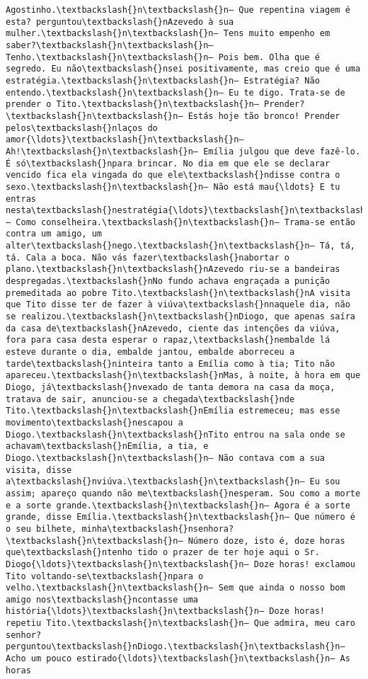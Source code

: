 \documentclass[11pt]{article}
\begin{document}
\begin{Verbatim}[commandchars=\\\{\}]
Agostinho.\textbackslash{}n\textbackslash{}n— Que repentina viagem é esta? perguntou\textbackslash{}nAzevedo à sua mulher.\textbackslash{}n\textbackslash{}n— Tens muito empenho em saber?\textbackslash{}n\textbackslash{}n— Tenho.\textbackslash{}n\textbackslash{}n— Pois bem. Olha que é segredo. Eu não\textbackslash{}nsei positivamente, mas creio que é uma estratégia.\textbackslash{}n\textbackslash{}n— Estratégia? Não entendo.\textbackslash{}n\textbackslash{}n— Eu te digo. Trata-se de prender o Tito.\textbackslash{}n\textbackslash{}n— Prender?\textbackslash{}n\textbackslash{}n— Estás hoje tão bronco! Prender pelos\textbackslash{}nlaços do amor{\ldots}\textbackslash{}n\textbackslash{}n— Ah!\textbackslash{}n\textbackslash{}n— Emília julgou que deve fazê-lo. É só\textbackslash{}npara brincar. No dia em que ele se declarar vencido fica ela vingada do que ele\textbackslash{}ndisse contra o sexo.\textbackslash{}n\textbackslash{}n— Não está mau{\ldots} E tu entras nesta\textbackslash{}nestratégia{\ldots}\textbackslash{}n\textbackslash{}n— Como conselheira.\textbackslash{}n\textbackslash{}n— Trama-se então contra um amigo, um alter\textbackslash{}nego.\textbackslash{}n\textbackslash{}n— Tá, tá, tá. Cala a boca. Não vás fazer\textbackslash{}nabortar o plano.\textbackslash{}n\textbackslash{}nAzevedo riu-se a bandeiras despregadas.\textbackslash{}nNo fundo achava engraçada a punição premeditada ao pobre Tito.\textbackslash{}n\textbackslash{}nA visita que Tito disse ter de fazer à viúva\textbackslash{}nnaquele dia, não se realizou.\textbackslash{}n\textbackslash{}nDiogo, que apenas saíra da casa de\textbackslash{}nAzevedo, ciente das intenções da viúva, fora para casa desta esperar o rapaz,\textbackslash{}nembalde lá esteve durante o dia, embalde jantou, embalde aborreceu a tarde\textbackslash{}ninteira tanto a Emília como à tia; Tito não apareceu.\textbackslash{}n\textbackslash{}nMas, à noite, à hora em que Diogo, já\textbackslash{}nvexado de tanta demora na casa da moça, tratava de sair, anunciou-se a chegada\textbackslash{}nde Tito.\textbackslash{}n\textbackslash{}nEmília estremeceu; mas esse movimento\textbackslash{}nescapou a Diogo.\textbackslash{}n\textbackslash{}nTito entrou na sala onde se achavam\textbackslash{}nEmília, a tia, e Diogo.\textbackslash{}n\textbackslash{}n— Não contava com a sua visita, disse a\textbackslash{}nviúva.\textbackslash{}n\textbackslash{}n— Eu sou assim; apareço quando não me\textbackslash{}nesperam. Sou como a morte e a sorte grande.\textbackslash{}n\textbackslash{}n— Agora é a sorte grande, disse Emília.\textbackslash{}n\textbackslash{}n— Que número é o seu bilhete, minha\textbackslash{}nsenhora?\textbackslash{}n\textbackslash{}n— Número doze, isto é, doze horas que\textbackslash{}ntenho tido o prazer de ter hoje aqui o Sr. Diogo{\ldots}\textbackslash{}n\textbackslash{}n— Doze horas! exclamou Tito voltando-se\textbackslash{}npara o velho.\textbackslash{}n\textbackslash{}n— Sem que ainda o nosso bom amigo nos\textbackslash{}ncontasse uma história{\ldots}\textbackslash{}n\textbackslash{}n— Doze horas! repetiu Tito.\textbackslash{}n\textbackslash{}n— Que admira, meu caro senhor? perguntou\textbackslash{}nDiogo.\textbackslash{}n\textbackslash{}n— Acho um pouco estirado{\ldots}\textbackslash{}n\textbackslash{}n— As horas 
\end{Verbatim}
\end{document}
